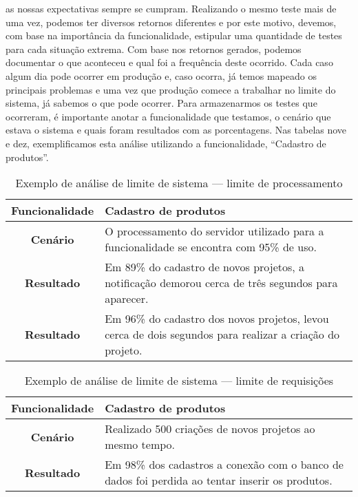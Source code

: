       as nossas expectativas sempre se cumpram. Realizando o mesmo teste mais de
      uma vez, podemos ter diversos retornos diferentes e por este motivo, devemos,
      com base na importância da funcionalidade, estipular uma quantidade de testes
      para cada situação extrema. Com base nos retornos gerados, podemos documentar
      o que aconteceu e qual foi a frequência deste ocorrido. Cada caso algum dia
      pode ocorrer em produção e, caso ocorra, já temos mapeado os principais
      problemas e uma vez que produção comece a trabalhar no limite do sistema,
      já sabemos o que pode ocorrer. Para armazenarmos os testes que ocorreram,
      é importante anotar a funcionalidade que testamos, o cenário que estava o
      sistema e quais foram resultados com as porcentagens. Nas tabelas nove e dez,
      exemplificamos esta análise utilizando a funcionalidade, “Cadastro de produtos”.

      \begin{table}[h!]
        \centering
        \begin{tabular}{|c|p{10cm}|}
          \hline
          \textbf{Funcionalidade} &
          Cadastro de produtos \\ \hline
          \textbf{Cenário} &
          O processamento do servidor utilizado para a funcionalidade se encontra
          com 95\% de uso. \\ \hline
          \textbf{Resultado} &
          Em 89\% do cadastro de novos projetos, a notificação demorou cerca de
          três segundos para aparecer. \\ \hline
          \textbf{Resultado} &
          Em 96\% do cadastro dos novos projetos, levou cerca de dois
          segundos para realizar a criação do projeto. \\ \hline
        \end{tabular}
        \caption{Exemplo de análise de limite de sistema — limite de processamento}
        \label{Tabela:9}
      \end{table}

      \begin{table}[h!]
        \centering
        \begin{tabular}{|c|p{10cm}|}
          \hline
          \textbf{Funcionalidade} &
          Cadastro de produtos \\ \hline
          \textbf{Cenário} &
          Realizado 500 criações de novos projetos ao mesmo tempo. \\ \hline
          \textbf{Resultado} &
          Em 98\% dos cadastros a conexão com o banco de dados foi perdida ao tentar
          inserir os produtos. \\ \hline
        \end{tabular}
        \caption{Exemplo de análise de limite de sistema — limite de requisições}
        \label{Tabela:10}
      \end{table}

